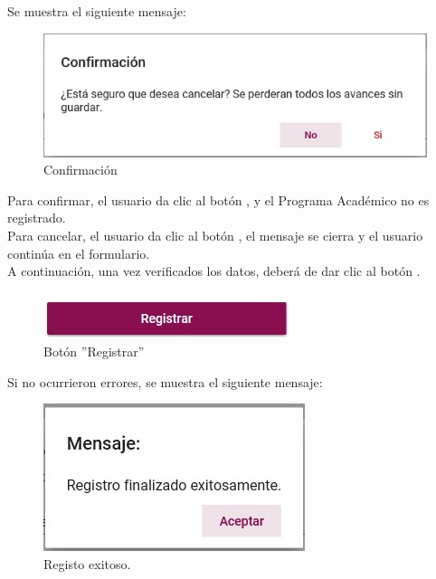          Se muestra el siguiente mensaje:

        \begin{figure}[H]
            \centering
            \hypertarget{confirmar}{\includegraphics[width=0.7\linewidth]{images/SP3/Confirmacion}}
            \caption{Confirmación}
            \label{confirmar}
        \end{figure}

        Para confirmar, el usuario da clic al botón , y el Programa Académico no es registrado.\\

        Para cancelar, el usuario da clic al botón , el mensaje se cierra y el usuario continúa en el formulario.\\

        A continuación, una vez verificados los datos, deberá de dar clic al botón .
        \begin{figure}[H]
            \centering
            \hypertarget{btnreg}{\includegraphics[width=0.7\linewidth]{images/SP3/BtnRegistrar}}
            \caption{Botón ''Registrar''}
            \label{btnreg}
        \end{figure}

        Si no ocurrieron errores, se muestra el siguiente mensaje:

        \begin{figure}[H]
            \centering
            \hypertarget{exito}{\includegraphics[width=0.7\linewidth]{images/SP3/Exitoso}}
            \caption{Registo exitoso.}
            \label{exito}
        \end{figure}

